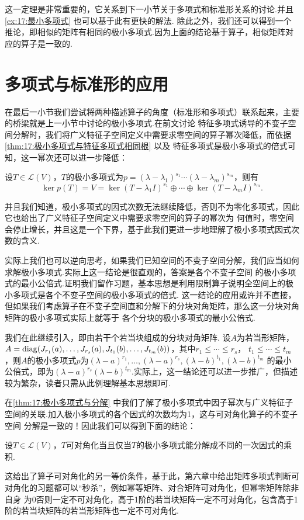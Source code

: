 这一定理是非常重要的，它关系到下一小节关于多项式和标准形关系的讨论.并且\autoref{ex:17:最小多项式} 也可以基于此有更快的解法.
除此之外，我们还可以得到一个推论，即相似的矩阵有相同的极小多项式.因为上面的结论基于算子，相似矩阵对应的算子是一致的.

\section{多项式与标准形的应用}
在最后一小节我们尝试将两种描述算子的角度（标准形和多项式）联系起来，主要的桥梁就是上一小节中讨论的极小多项式.在前文讨论
特征多项式诱导的不变子空间分解时，我们将广义特征子空间定义中需要求零空间的算子幂次降低，而依据\autoref{thm:17:极小多项式与特征多项式相同根} 以及
特征多项式是极小多项式的倍式可知，这一幂次还可以进一步降低：
\begin{theorem} \label{thm:17:极小多项式与分解}
    设$T\in \mathcal{L}(V)$，$T$的极小多项式为$p=(\lambda-\lambda_1)^{s_1}\cdots(\lambda-\lambda_m)^{s_m}$，则有
    \[\ker p(T)=V=\ker (T-\lambda_1I)^{s_1}\oplus\cdots\oplus\ker (T-\lambda_mI)^{s_m}.\]
\end{theorem}
并且我们知道，极小多项式的因式次数无法继续降低，否则不为零化多项式，因此它也给出了广义特征子空间定义中需要求零空间的算子的幂次为
何值时，零空间会停止增长，并且这是一个下界，基于此我们更进一步地理解了极小多项式因式次数的含义.

实际上我们也可以逆向思考，如果我们已知空间的不变子空间分解，我们应当如何求解极小多项式.实际上这一结论是很直观的，答案是各个不变子空间
的极小多项式的最小公倍式.证明我们留作习题，基本思想是利用限制算子说明全空间上的极小多项式是各个不变子空间的极小多项式的倍式.
这一结论的应用或许并不直接，但如果我们考虑算子在不变子空间直和分解下的分块对角矩阵，那么这一分块对角矩阵的极小多项式实际上就等于
各个分块的极小多项式的最小公倍式.
\begin{example} \label{thm:17:若当形矩阵极小多项式}
    我们在此继续引入，即由若干个若当块组成的分块对角矩阵. 设$A$为若当形矩阵，
    $A=\operatorname{diag}(J_{r_1}(a),\ldots,J_{r_s}(a),J_{t_1}(b),\ldots,J_{t_m}(b))$，其中$r_1\leqslant\cdots\leqslant r_s$，
    $t_1\leqslant\cdots\leqslant t_m$，则$A$的极小多项式$p$为$(\lambda-a)^{r_1},\ldots,(\lambda-a)^{r_s},(\lambda-b)^{t_1},(\lambda-b)^{t_m}$
    的最小公倍式，即为$(\lambda-a)^{r_s}(\lambda-b)^{t_m}$.实际上，这一结论还可以进一步推广，但描述较为繁杂，读者只需从此例理解基本思想即可.
\end{example}
在\autoref{thm:17:极小多项式与分解} 中我们了解了极小多项式中因子幂次与广义特征子空间的关联.加入极小多项式的各个因式的次数均为1，这与可对角化算子的不变子空间
分解是一致的！因此我们可以得到下面的结论：
\begin{theorem}
    设$T\in \mathcal{L}(V)$，$T$可对角化当且仅当$T$的极小多项式能分解成不同的一次因式的乘积.
\end{theorem}
这给出了算子可对角化的另一等价条件，基于此，第六章中给出矩阵多项式判断可对角化的习题都可以``秒杀''，例如幂等矩阵、对合矩阵可对角化，但幂零矩阵除非自身
为0否则一定不可对角化，高于1阶的若当块矩阵一定不可对角化，包含高于1阶的若当块矩阵的若当形矩阵也一定不可对角化.

